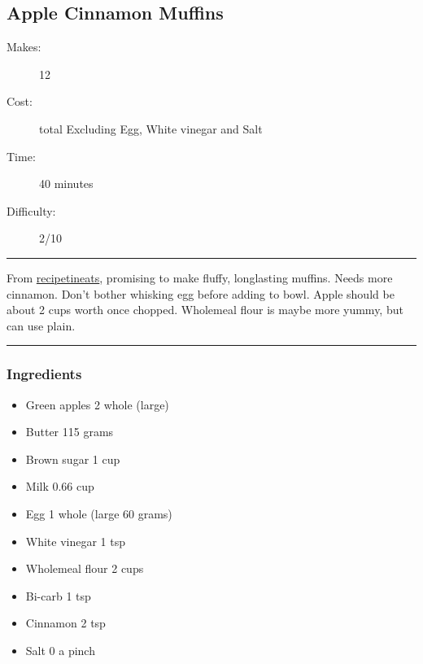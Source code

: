 \documentclass[]{article}
\begin{document}
\subsection*{\center\huge Apple Cinnamon Muffins}
\begin{description}
\item[Makes:] 12 
\item[Cost:]  total Excluding Egg, White vinegar and Salt
\item[Time:] 40 minutes
\item[Difficulty:] 2/10
\end{description}
\vspace{0.2cm}\hrule\vspace{0.5cm}
\begin{adjustwidth}{0.5 cm}{0.5 cm}

From \href{https://www.recipetineats.com/brown-sugar-apple-muffins/}{recipetineats}, promising to make fluffy, longlasting muffins. Needs more cinnamon. Don't bother whisking egg before adding to bowl. Apple should be about 2 cups worth once chopped. Wholemeal flour is maybe more yummy, but can use plain. \hfill{}\color{black}

\end{adjustwidth}
\vspace{0.5cm}\hrule
\subsubsection*{\Large Ingredients}
\begin{multicols}{2}
\begin{itemize}
 \item Green apples \hfill 2 whole (large)
 \item Butter \hfill 115 grams
 \item Brown sugar \hfill 1 cup
 \item Milk \hfill 0.66 cup
 \item Egg \hfill 1 whole (large 60 grams)
 \item White vinegar \hfill 1 tsp
 \item Wholemeal flour \hfill 2 cups
 \item Bi-carb \hfill 1 tsp
 \item Cinnamon \hfill 2 tsp
 \item Salt \hfill 0 a pinch
\end{itemize}
\end{multicols}
\end{document}
